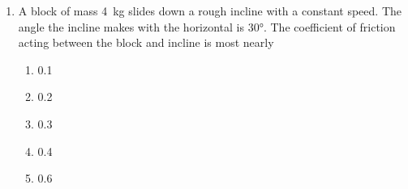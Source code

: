 \documentclass{../../../oss-apphys}
\begin{document}
\begin{multicols}{2}
\begin{enumerate}[resume,leftmargin=18pt]
    \columnbreak
    
  \item A block of mass \SI{4}{\kilo\gram} slides down a rough incline with a
    constant speed. The angle the incline makes with the horizontal is
    \ang{30}. The coefficient of friction acting between the block and incline
    is most nearly
    \begin{center}
    \end{center}
    \begin{enumerate}[nosep,leftmargin=18pt,label=(\Alph*)]
    \item 0.1
    \item 0.2
    \item 0.3
    \item 0.4
    \item 0.6
    \end{enumerate}


\end{enumerate}
\end{multicols}
\end{document}
